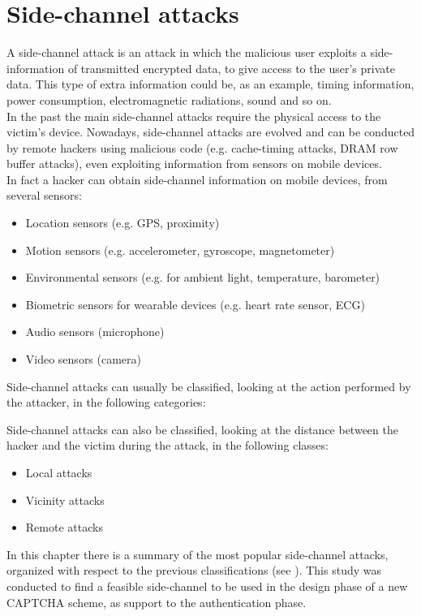 \chapter{Side-channel attacks}\label{chapter:SideCH}
A side-channel attack is an attack in which the malicious user exploits a side-information of transmitted encrypted data, to give access to the user's private data. 
This type of extra information could be, as an example, timing information, power consumption, electromagnetic radiations, sound and so on.\\
In the past the main side-channel attacks require the physical access to the victim's device. Nowadays, side-channel attacks are evolved and can be conducted by remote hackers using malicious code (e.g. cache-timing attacks, DRAM row buffer attacks), even exploiting information from sensors on mobile devices\cite{side_classification}.\\
In fact a hacker can obtain side-channel information on mobile devices, from several sensors\cite{side_attacks}:
\begin{itemize}
\item{Location sensors (e.g. GPS, proximity)}
\item{Motion sensors (e.g. accelerometer, gyroscope, magnetometer)}
\item{Environmental sensors (e.g. for ambient light, temperature, barometer)}
\item{Biometric sensors for wearable devices (e.g. heart rate sensor, ECG)}
\item{Audio sensors (microphone)}
\item{Video sensors (camera)}
\end{itemize}
Side-channel attacks can usually be classified, looking at the action performed by the attacker, in the following categories:
\begin{itemize}
\end{itemize}
Side-channel attacks can also be classified, looking at the distance between the hacker and the victim during the attack, in the following classes:
\begin{itemize}
\item{Local attacks}
\item{Vicinity attacks}
\item{Remote attacks}
\end{itemize}
In this chapter there is a summary of the most popular side-channel attacks, organized with respect to the previous classifications (see ). This study was conducted to find a feasible side-channel to be used in the design phase of a new CAPTCHA scheme, as support to the authentication phase.

